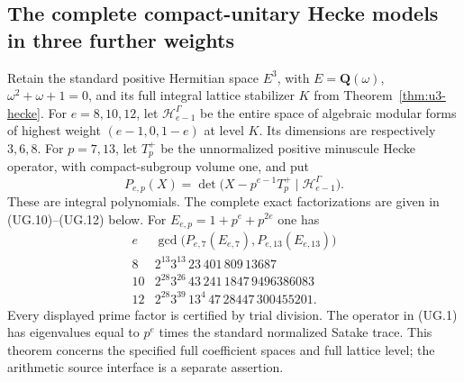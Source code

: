 \subsection{The complete compact-unitary Hecke models in three further weights}
\label{sec:u3-general-harmonics}

\begin{theorem}[K17-U3-GENERAL]\label{thm:u3-general}
Retain the standard positive Hermitian space $E^3$, with
$E=\mathbf Q(\omega)$, $\omega^2+\omega+1=0$, and its full integral
lattice stabilizer $K$ from Theorem~\ref{thm:u3-hecke}.
For $e=8,10,12$, let $\mathcal H_{e-1}^{\Gamma}$ be the entire space
of algebraic modular forms of highest weight $(e-1,0,1-e)$ at level $K$.
Its dimensions are respectively $3,6,8$.
For $p=7,13$, let $T_p^+$ be the unnormalized positive minuscule
Hecke operator, with compact-subgroup volume one, and put
\[
 P_{e,p}(X)=\det\bigl(X-p^{e-1}T_p^+\mid
                       \mathcal H_{e-1}^{\Gamma}\bigr).
 \tag{UG.1}
\]
These are integral polynomials. The complete exact factorizations are
given in (UG.10)--(UG.12) below. For $E_{e,p}=1+p^e+p^{2e}$ one has
\[
\begin{array}{c|l}
e&\gcd\bigl(P_{e,7}(E_{e,7}),P_{e,13}(E_{e,13})\bigr)\\ \hline
8&2^{13}3^{13}\,23\,401\,809\,13687\\
10&2^{28}3^{26}\,43\,241\,1847\,9496386083\\
12&2^{28}3^{39}\,13^4\,47\,28447\,300455201.
\end{array}
\tag{UG.2}
\]
Every displayed prime factor is certified by trial division. The
operator in (UG.1) has eigenvalues equal to $p^e$ times the standard
normalized Satake trace. This theorem concerns the specified full
coefficient spaces and full lattice level; the arithmetic source
interface is a separate assertion.
\end{theorem}

